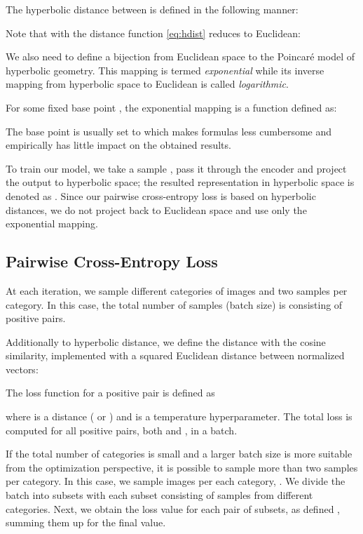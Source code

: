 \documentclass[10pt,twocolumn,letterpaper]{article}
\begin{document}
The hyperbolic distance between  is defined in the following manner:


Note that with  the distance function \eqref{eq:hdist} reduces to Euclidean:  

We also need to define a bijection from Euclidean space to the Poincar\'e model of hyperbolic geometry. This mapping is termed \textit{exponential} while its inverse mapping from hyperbolic space to Euclidean is called \textit{logarithmic}. 

For some fixed base point , the exponential mapping is a function  defined as:

The base point  is usually set to  which makes formulas less cumbersome and empirically has little impact on the obtained results.

To train our model, we take a sample , pass it through the encoder and project the output to hyperbolic space; the resulted representation in hyperbolic space is denoted as . Since our pairwise cross-entropy loss is based on hyperbolic distances, we do not project  back to Euclidean space and use only the exponential mapping. 

\subsection{Pairwise Cross-Entropy Loss}
\label{sec:xent}

At each iteration, we sample  different categories of images and two samples per category. In this case, the total number of samples (batch size) is  consisting of  positive pairs.

Additionally to hyperbolic distance, we define the distance with the cosine similarity, implemented with a squared Euclidean distance between normalized vectors:


The loss function for a positive pair  is defined as



\noindent
where  is a distance ( or ) and  is a temperature hyperparameter. The total loss is computed for all positive pairs, both  and , in a batch.

If the total number of categories is small and a larger batch size is more suitable from the optimization perspective, it is possible to sample more than two samples per category. In this case, we sample  images per each category, . We divide the batch  into  subsets with each subset consisting of  samples from different categories. Next, we obtain the loss value for each pair of subsets, as defined , summing them up for the final value.
\end{document}
